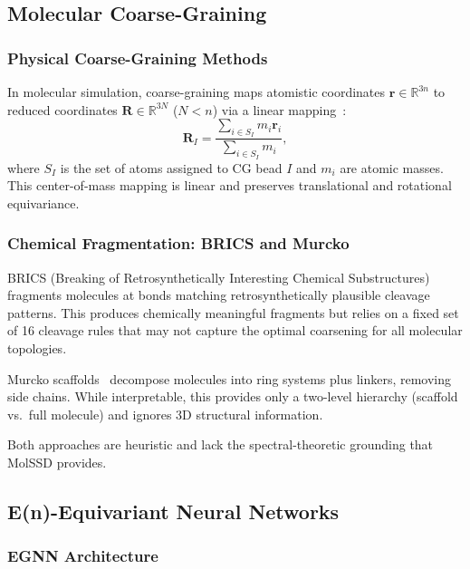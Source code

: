 \documentclass[12pt,a4paper]{article}
\providecommand{\R}{}
\renewcommand{\R}{\mathbb{R}}
\begin{document}
\subsection{Molecular Coarse-Graining}\label{sec:bg_coarsegraining}

\subsubsection{Physical Coarse-Graining Methods}

In molecular simulation, coarse-graining maps atomistic coordinates $\bm{r} \in \R^{3n}$ to reduced coordinates $\bm{R} \in \R^{3N}$ ($N < n$) via a linear mapping~\cite{noid2008cg, kmiecik2016cg}:
\begin{equation}\label{eq:cg_map}
    \bm{R}_I = \frac{\sum_{i \in S_I} m_i \bm{r}_i}{\sum_{i \in S_I} m_i},
\end{equation}
where $S_I$ is the set of atoms assigned to CG bead $I$ and $m_i$ are atomic masses. This center-of-mass mapping is linear and preserves translational and rotational equivariance.

\subsubsection{Chemical Fragmentation: BRICS and Murcko}

BRICS (Breaking of Retrosynthetically Interesting Chemical Substructures)~\cite{degen2008brics} fragments molecules at bonds matching retrosynthetically plausible cleavage patterns. This produces chemically meaningful fragments but relies on a fixed set of 16 cleavage rules that may not capture the optimal coarsening for all molecular topologies.

Murcko scaffolds~\cite{bemis1996murcko} decompose molecules into ring systems plus linkers, removing side chains. While interpretable, this provides only a two-level hierarchy (scaffold vs.\ full molecule) and ignores 3D structural information.

Both approaches are heuristic and lack the spectral-theoretic grounding that MolSSD provides.

\subsection{E(n)-Equivariant Neural Networks}\label{sec:bg_egnn}

\subsubsection{EGNN Architecture}
\end{document}
